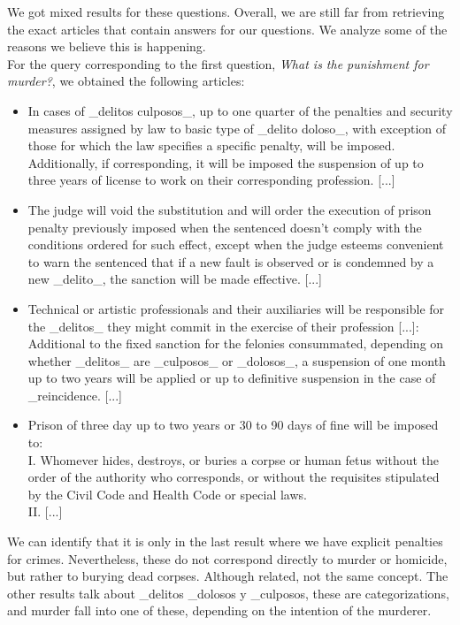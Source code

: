 \documentclass[letterpaper, margin=1in]{article}
\begin{document}
We got mixed results for these questions. Overall, we are still far from retrieving the exact articles that contain answers for our questions. We analyze some of the reasons we believe this is happening. \\

For the query corresponding to the first question, \textit{What is the punishment for murder?}, we obtained the following articles:
\begin{itemize}
\item In cases of {\_}delitos culposos{\_}, up to one quarter of the penalties and security measures assigned by law to basic type of {\_}delito doloso{\_}, with exception of those for which the law specifies a specific penalty, will be imposed. Additionally, if corresponding, it will be imposed the suspension of up to three years of license to work on their corresponding profession. [...]
\item The judge will void the substitution and will order the execution of prison penalty previously imposed when the sentenced doesn't comply with the conditions ordered for such effect, except when the judge esteems convenient to warn the sentenced that if a new fault is observed or is condemned by a new {\_}delito{\_}, the sanction will be made effective. [...]
\item Technical or artistic professionals and their auxiliaries will be responsible for the {\_}delitos{\_} they might commit in the exercise of their profession [...]: \\
Additional to the fixed sanction for the felonies consummated, depending on whether {\_}delitos{\_} are {\_}culposos{\_} or {\_}dolosos{\_}, a suspension of one month up to two years will be applied or up to definitive suspension in the case of {\_}reincidence. [...]
\item Prison of three day up to two years or 30 to 90 days of fine will be imposed to: \\
I. Whomever hides, destroys, or buries a corpse or human fetus without the order of the authority who corresponds, or without the requisites stipulated by the Civil Code and Health Code or special laws. \\
II. [...]
\end{itemize}

We can identify that it is only in the last result where we have explicit penalties for crimes. Nevertheless, these do not correspond directly to murder or homicide, but rather to burying dead corpses. Although related, not the same concept. The other results talk about {\_}delitos {\_}dolosos y {\_}culposos, these are categorizations, and murder fall into one of these, depending on the intention of the murderer. 
\end{document}
